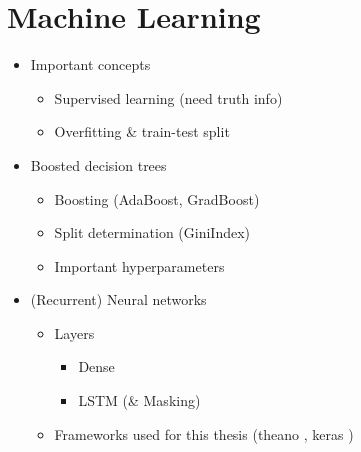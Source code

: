 \chapter{Machine Learning}
\label{sec:ml}

\begin{itemize}
\item Important concepts
  \begin{itemize}
  \item Supervised learning (need truth info)
  \item Overfitting \& train-test split
  \end{itemize}

\item Boosted decision trees
  \begin{itemize}
  \item Boosting (AdaBoost, GradBoost)
  \item Split determination (GiniIndex)
  \item Important hyperparameters
  \end{itemize}

\item (Recurrent) Neural networks
  \begin{itemize}
  \item Layers
    \begin{itemize}
    \item Dense

    \item LSTM (\& Masking)

    \end{itemize}

  \item Frameworks used for this thesis (theano \cite{theano}, keras \cite{keras})

  \end{itemize}

\end{itemize}
